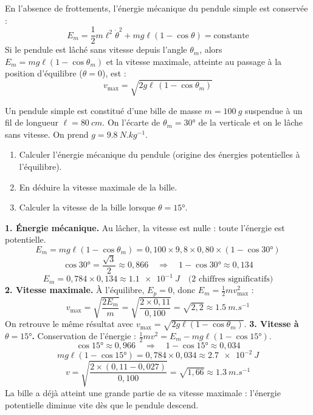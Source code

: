 \documentclass[11pt]{article}
\newcommand{\cle}[1]{{\popxbold\color{popdark}#1}}
\begin{document}
\begin{propriete}
En l'absence de frottements, l'énergie mécanique du pendule simple est conservée :
\[ E_m = \frac{1}{2}m\ell^2\dot{\theta}^2 + mg\ell(1 - \cos\theta) = \text{constante} \]
Si le pendule est lâché sans vitesse depuis l'angle $\theta_m$, alors $E_m = mg\ell(1-\cos\theta_m)$ et la \cle{vitesse maximale}, atteinte au passage à la position d'équilibre ($\theta = 0$), est :
\[ v_{\max} = \sqrt{2g\ell\,(1 - \cos\theta_m)} \]
\end{propriete}

\begin{exoresolu}
Un pendule simple est constitué d'une bille de masse $m = \SI{100}{g}$ suspendue à un fil de longueur $\ell = \SI{80}{cm}$. On l'écarte de $\theta_m = 30°$ de la verticale et on le lâche sans vitesse. On prend $g = \SI{9,8}{N.kg^{-1}}$.
\begin{enumerate}
\item Calculer l'énergie mécanique du pendule (origine des énergies potentielles à l'équilibre).
\item En déduire la vitesse maximale de la bille.
\item Calculer la vitesse de la bille lorsque $\theta = 15°$.
\end{enumerate}
\tcblower
\textbf{1. Énergie mécanique.} Au lâcher, la vitesse est nulle : toute l'énergie est potentielle.
\[ E_m = mg\ell(1-\cos\theta_m) = 0{,}100\times 9{,}8\times 0{,}80\times (1 - \cos 30°) \]
\[ \cos 30° = \frac{\sqrt{3}}{2} \approx 0{,}866 \quad\Rightarrow\quad 1-\cos 30° \approx 0{,}134 \]
\[ E_m = 0{,}784\times 0{,}134 \approx \SI{1,1e-1}{J} \quad\text{(2 chiffres significatifs)} \]
\textbf{2. Vitesse maximale.} À l'équilibre, $E_p = 0$, donc $E_m = \tfrac{1}{2}mv_{\max}^2$ :
\[ v_{\max} = \sqrt{\frac{2E_m}{m}} = \sqrt{\frac{2\times 0{,}11}{0{,}100}} = \sqrt{2{,}2} \approx \SI{1,5}{m.s^{-1}} \]
On retrouve le même résultat avec $v_{\max} = \sqrt{2g\ell(1-\cos\theta_m)}$.
\textbf{3. Vitesse à $\theta = 15°$.} Conservation de l'énergie : $\tfrac{1}{2}mv^2 = E_m - mg\ell(1-\cos 15°)$.
\[ \cos 15° \approx 0{,}966 \quad\Rightarrow\quad 1-\cos 15° \approx 0{,}034 \]
\[ mg\ell(1-\cos 15°) = 0{,}784\times 0{,}034 \approx \SI{2,7e-2}{J} \]
\[ v = \sqrt{\frac{2\times(0{,}11 - 0{,}027)}{0{,}100}} = \sqrt{1{,}66} \approx \SI{1,3}{m.s^{-1}} \]
La bille a déjà atteint une grande partie de sa vitesse maximale : l'énergie potentielle diminue vite dès que le pendule descend.
\end{exoresolu}
\end{document}
